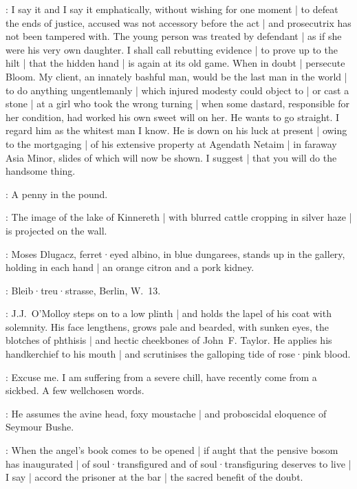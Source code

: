 \JJOM:
I say it
and I say it emphatically,
without wishing for one moment |
to defeat the ends of justice,
accused was not accessory before the act |
and prosecutrix has not been tampered with.
The young person was treated by defendant |
as if she were his very own daughter.
I shall call rebutting evidence |
to prove up to the hilt |
that the hidden hand |
is again at its old game.
When in doubt |
persecute Bloom.
My client,
an innately bashful man,
would be the last man in the world |
to do anything ungentlemanly |
which injured modesty could object to |
or cast a stone |
at a girl who took the wrong turning |
when some dastard,
responsible for her condition,
had worked his own sweet will on her.
He wants to go straight.
I regard him as the whitest man I know.
He is down on his luck at present |
owing to the mortgaging |
of his extensive property at Agendath Netaim |
in faraway Asia Minor,
slides of which will now be shown.
I suggest |
that you will do the handsome thing.

\Bloom:
A penny in the pound.

:
The image of the lake of Kinnereth |
with blurred cattle cropping in silver haze |
is projected on the wall.

:
Moses Dlugacz,
ferret·eyed albino,
in blue dungarees,
stands up in the gallery,
holding in each hand |
an orange citron and a pork kidney.

\Dlugacz:
Bleib·treu·strasse,
Berlin,
W.~13.

:
J.J.~O'Molloy steps on to a low plinth |
and holds the lapel of his coat with solemnity.
His face lengthens,
grows pale and bearded,
with sunken eyes,
the blotches of phthisis |
and hectic cheekbones of John~F. Taylor.
He applies his handkerchief to his mouth |
and scrutinises the galloping tide of rose·pink blood.

\JJOM:
Excuse me.
I am suffering from a severe chill,
have recently come from a sickbed.
A few wellchosen words.

:
He assumes the avine head,
foxy moustache |
and proboscidal eloquence of Seymour Bushe.

\JJOM:
When the angel's book comes to be opened |
if aught that the pensive bosom has inaugurated |
of soul·transfigured and of soul·transfiguring deserves to live |
I say |
accord the prisoner at the bar |
the sacred benefit of the doubt.

